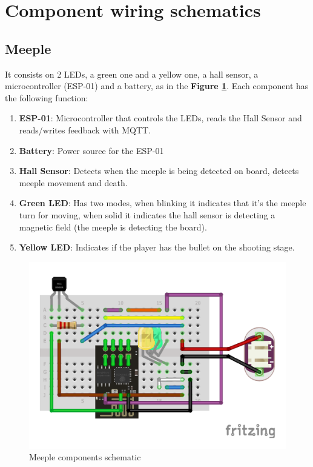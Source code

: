 \documentclass[../main.tex]{subfiles}
\begin{document}
\section{Component wiring schematics}

\subsection{Meeple}

It consists on 2 LEDs, a green one and a yellow one, a hall sensor, a microcontroller (ESP-01) and a battery, as in the \textbf{Figure \ref{fig:meeple}}. Each component has the following function:

\begin{enumerate}
    \item \textbf{ESP-01}: Microcontroller that controls the LEDs, reads the Hall Sensor and reads/writes feedback with MQTT.
    \item \textbf{Battery}: Power source for the ESP-01
    \item \textbf{Hall Sensor}: Detects when the meeple is being detected on board, detects meeple movement and death.
    \item \textbf{Green LED}: Has two modes, when blinking it indicates that it's the meeple turn for moving, when solid it indicates the hall sensor is detecting a magnetic field (the meeple is detecting the board).
    \item \textbf{Yellow LED}: Indicates if the player has the bullet on the shooting stage.
\end{enumerate}

\begin{figure}[!htb]
    \centering
    \includegraphics[width= 0.8\linewidth]{../media/figures/schematic_meeple.pdf}
    \caption{Meeple components schematic}
    \label{fig:meeple}
\end{figure}
\end{document}
